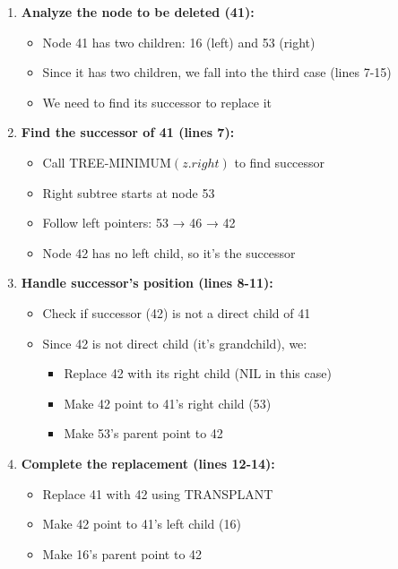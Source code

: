 \begin{enumerate}
    \item \textbf{Analyze the node to be deleted (41):}
        \begin{itemize}
            \item Node 41 has two children: 16 (left) and 53 (right)
            \item Since it has two children, we fall into the third case (lines 7-15)
            \item We need to find its successor to replace it
        \end{itemize}
    
    \item \textbf{Find the successor of 41 (lines 7):}
        \begin{itemize}
            \item Call TREE-MINIMUM$(z.right)$ to find successor
            \item Right subtree starts at node 53
            \item Follow left pointers: 53 → 46 → 42
            \item Node 42 has no left child, so it's the successor
        \end{itemize}
    
    \item \textbf{Handle successor's position (lines 8-11):}
        \begin{itemize}
            \item Check if successor (42) is not a direct child of 41
            \item Since 42 is not direct child (it's grandchild), we:
                \begin{itemize}
                    \item Replace 42 with its right child (NIL in this case)
                    \item Make 42 point to 41's right child (53)
                    \item Make 53's parent point to 42
                \end{itemize}
        \end{itemize}

    \item \textbf{Complete the replacement (lines 12-14):}
        \begin{itemize}
            \item Replace 41 with 42 using TRANSPLANT
            \item Make 42 point to 41's left child (16)
            \item Make 16's parent point to 42
        \end{itemize}
\end{enumerate}


